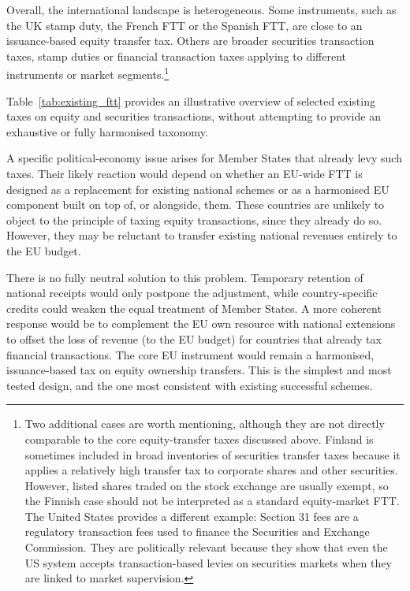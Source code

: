 \documentclass[../../main]{subfiles}
\begin{document}
Overall, the international landscape is heterogeneous. Some instruments, such as the UK stamp duty, the French FTT or the Spanish FTT, are close to an issuance-based equity transfer tax. Others are broader securities transaction taxes, stamp duties or financial transaction taxes applying to different instruments or market segments.\footnote{Two additional cases are worth mentioning, although they are not directly comparable to the core equity-transfer taxes discussed above. Finland is sometimes included in broad inventories of securities transfer taxes because it applies a relatively high transfer tax to corporate shares and other securities. However, listed shares traded on the stock exchange are usually exempt,
so the Finnish case should not be interpreted as a standard equity-market FTT. The United States provides a different example: Section 31 fees are a regulatory transaction fees used to finance the Securities and Exchange Commission. They are politically relevant because they show that even the US system accepts transaction-based levies on securities markets when they are linked to market supervision.} 

Table~\ref{tab:existing_ftt} provides an illustrative overview of selected existing taxes on equity and securities transactions, without attempting to provide an exhaustive or fully harmonised taxonomy.

A specific political-economy issue arises for Member States that already levy such taxes. Their likely reaction would depend on whether an EU-wide FTT is designed as a replacement for existing national schemes or as a harmonised EU component built on top of, or alongside, them. These countries are unlikely to object to the principle of taxing equity transactions, since they already do so. However, they may be reluctant to transfer existing national revenues entirely to the EU budget. %

There is no fully neutral solution to this problem. Temporary retention of national receipts would only postpone the adjustment, while country-specific credits could weaken the equal treatment of Member States. %
A more coherent response would be to complement the EU own resource with national extensions to offset the loss of revenue (to the EU budget) for countries that already tax financial transactions. %
The core EU instrument would remain a harmonised, issuance-based tax on equity ownership transfers. This is the simplest and most tested design, and the one most consistent with existing successful schemes.
\end{document}
